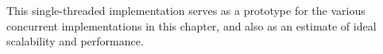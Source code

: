 This single-threaded implementation serves as a prototype for the various
concurrent implementations in this chapter, and also as an estimate of
ideal scalability and performance.









